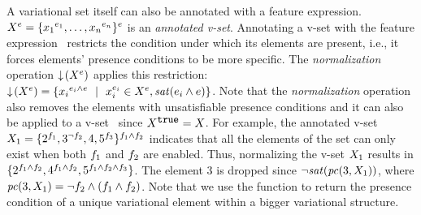 A variational set itself can also be annotated with a feature expression.
%
$\annot \vset = \setDef {\annot [\dimMeta_1] {\elem_1},\ldots,\annot [\dimMeta_n] {\elem_n}}^\dimMeta$ is an
\emph{annotated v-set}.
Annotating a v-set with the feature expression \dimMeta\ 
restricts the condition under which its elements are present, i.e., it forces
elements' presence conditions to be more specific. 
The \emph{normalization}
operation $\pushIn {\annot \vset}$ applies this restriction:
\ensuremath{
\pushIn {\annot \vset}
= 
\setDef{\annot [\dimMeta_i \wedge \dimMeta] {\elem_i} \myOR 
\annot [\dimMeta_i] \elem_i \in \annot \vset, \sat {\dimMeta_i \wedge \dimMeta}
}
}.
Note that the \emph{normalization} operation also removes the elements
with unsatisfiable presence conditions and it can also be applied
to a v-set \vset\ since $\annot [\t] \vset = \vset$.
%
For example, the annotated v-set
$\vset_1 = \{\annot [\A] 2, \annot [\neg \B] 3, 4, \annot [\C] 5\}^{\A \wedge \B}$
indicates that all the elements of the set can only exist
when both $\A$ and $\B$ are enabled. Thus, normalizing the v-set $\vset_1$
results in
$\{\annot [\A \wedge \B] 2,\annot [\A \wedge \B] 4,\annot [\A \wedge \B \wedge \C] 5\}$. The element $3$ is dropped 
since 
\ensuremath{\neg \sat {\getPCfrom 3 {\vset_1} }},
where
\ensuremath{
{\getPCfrom 3 {\vset_1} } = \neg \B \wedge (\A \wedge \B)}.
Note that we use the function \getPCfrom \elem {\annot \vset} to 
return the presence condition of a unique variational element within a bigger
variational structure.


